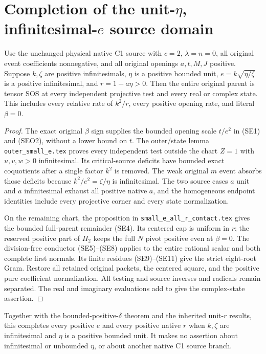 \section[Completion of the unit-eta, infinitesimal-e source domain]{Completion of the unit-$\eta$, infinitesimal-$e$ source domain}

\begin{theorem}
Use the unchanged physical native C1 source with $c=2$, $\lambda=n=0$,
all original event coefficients nonnegative, and all original openings
$a,t,M,J$ positive. Suppose $k,\zeta$ are positive infinitesimals,
$\eta$ is a positive bounded unit, $e=k\sqrt{\eta/\zeta}$ is a positive
infinitesimal, and $r=1-a\eta>0$. Then the entire original parent is
tensor SOS at every independent projective test and every real or
complex state. This includes every relative rate of $k^2/r$, every
positive opening rate, and literal $\beta=0$.
\end{theorem}

\begin{proof}
The exact original $\beta$ sign supplies the bounded opening scale
$t/e^2$ in (SE1) and (SEO2), without a lower bound on $t$.
The outer/state lemma \texttt{outer\_small\_e.tex} proves every
independent test outside the chart $Z=1$ with $u,v,w>0$ infinitesimal.
Its critical-source deficits have bounded exact coquotients after a
single factor $k^2$ is removed. The weak original $m$ event absorbs
those deficits because $k^2/e^2=\zeta/\eta$ is infinitesimal.
The two source cases $a$ unit and $a$ infinitesimal exhaust all positive
native $a$, and the homogeneous endpoint identities include every
projective corner and every state normalization.

On the remaining chart, the proposition in
\texttt{small\_e\_all\_r\_contact.tex} gives the bounded full-parent
remainder (SE4). Its centered cap is uniform in $r$; the reserved
positive part of $\Pi_2$ keeps the full $N$ pivot positive even at
$\beta=0$. The division-free conductor (SE5)--(SE8) applies to the
entire rational scalar and both complete first normals. Its finite
residues (SE9)--(SE11) give the strict eight-root Gram. Restore all
retained original packets, the centered square, and the positive pure
coefficient normalization. All testing and source inverses and radicals
remain separated. The real and imaginary evaluations add to give the
complex-state assertion.
\end{proof}

Together with the bounded-positive-$\delta$ theorem and the inherited
unit-$r$ results, this completes every positive $e$ and every positive
native $r$ when $k,\zeta$ are infinitesimal and $\eta$ is a positive
bounded unit. It makes no assertion about infinitesimal or unbounded
$\eta$, or about another native C1 source branch.
